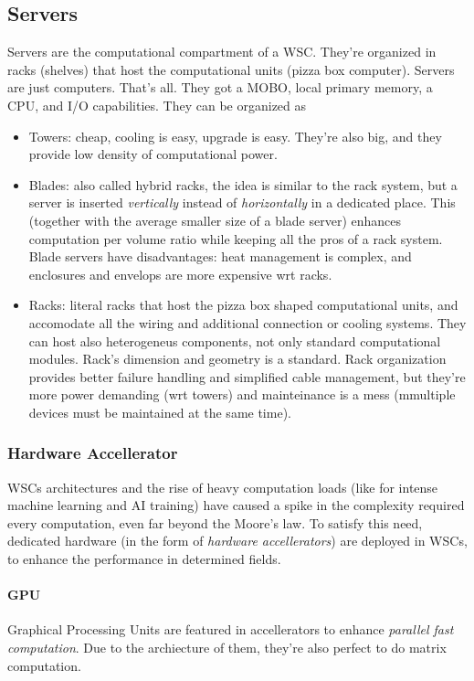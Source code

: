 \documentclass[10pt,a4paper]{article}
\begin{document}
			\subsection{Servers}
				Servers are the computational compartment of a WSC. They're organized in racks (shelves) that host the computational units (pizza box computer). Servers are just computers. That's all. They got a MOBO, local primary memory, a CPU, and I/O capabilities. They can be organized as
				\begin{itemize}
					\item Towers: cheap, cooling is easy, upgrade is easy. They're also big, and they provide low density of computational power.
					\item Blades: also called hybrid racks, the idea is similar to the rack system, but a server is inserted \emph{vertically} instead of \emph{horizontally} in a dedicated place. This (together with the average smaller size of a blade server) enhances computation per volume ratio while keeping all the pros of a rack system. Blade servers have disadvantages: heat management is complex, and enclosures and envelops are more expensive wrt racks.
					\item Racks: literal racks that host the pizza box shaped computational units, and accomodate all the wiring and additional connection or cooling systems. They can host also heterogeneus components, not only standard computational modules. Rack's dimension and geometry is a standard. Rack organization provides better failure handling and simplified cable management, but they're more power demanding (wrt towers) and mainteinance is a mess (mmultiple devices must be maintained at the same time).
				\end{itemize}
				
				\subsubsection{Hardware Accellerator}
					WSCs architectures and the rise of heavy computation loads (like for intense machine learning and AI training) have caused a spike in the complexity required every computation, even far beyond the Moore's law. To satisfy this need, dedicated hardware (in the form of \emph{hardware accellerators}) are deployed in WSCs, to enhance the performance in determined fields.
					
					\paragraph{GPU}
						Graphical Processing Units are featured in accellerators to enhance \emph{parallel fast computation}. Due to the archiecture of them, they're also perfect to do matrix computation. 
						
\end{document}
